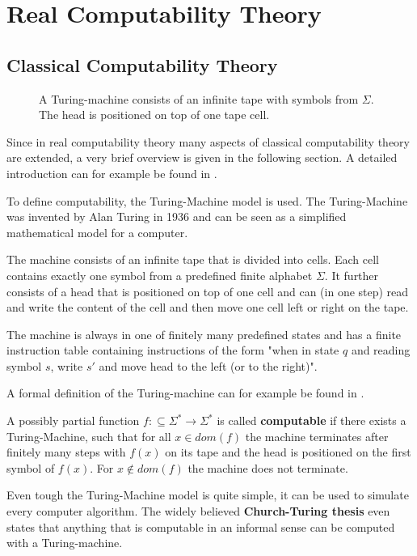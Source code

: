 \section{Real Computability Theory}\label{sec:real computability}
\subsection{Classical Computability Theory}
 \begin{figure}[h]
   \centering
   
   \caption{A Turing-machine consists of an infinite tape with symbols from
   $\Sigma$. The head is positioned on top of one tape cell.}
 \end{figure}
 Since in real computability theory many aspects of classical computability theory are extended, 
 a very brief overview is given in the following section. 
 A detailed introduction can for example be found in \cite{computability}.

 To define computability, the Turing-Machine model is used.
 The Turing-Machine was invented by Alan Turing in 1936 \cite{turing36} and can
 be seen as a simplified mathematical model for a computer.

 The machine consists of an infinite tape that is divided into cells. 
 Each cell contains exactly one symbol from a predefined finite alphabet
 $\Sigma$.
 It further consists of a head that is positioned on top of one cell 
 and can (in one step) read and write the content of the cell and then move one
 cell left or right on the tape.

 The machine is always in one of finitely many predefined states and has a finite
 instruction table containing instructions of the form "when in state $q$ and
 reading symbol $s$, write $s'$ and move head to the left (or to the right)".

 A formal definition of the Turing-machine can for example be found in \cite{hopcroft2013}.
 
 \begin{definition}
 	A possibly partial function $f:\subseteq \Sigma^* \to \Sigma^*$ is called \textbf{computable} if there exists 
 	a Turing-Machine, such that for all $x \in dom(f)$ the machine terminates after finitely many steps with $f(x)$ on its 
 	tape and the head is positioned on the first symbol of $f(x)$. 
  For $x \not \in dom(f)$ the machine does not terminate.
 \end{definition}

 Even tough the Turing-Machine model is quite simple, it can be used to
 simulate every computer algorithm.
 The widely believed \textbf{Church-Turing thesis} even states that anything
 that is computable in an informal sense can be computed with a
 Turing-machine.

